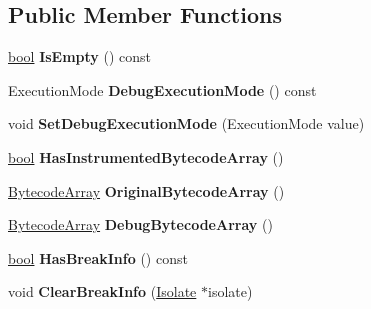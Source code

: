 \subsection*{Public Member Functions}
\begin{DoxyCompactItemize}
\item 
\mbox{\label{classv8_1_1internal_1_1DebugInfo_aa28d22bfcd83df5195dfd2e04b720a31}} 
\mbox{\hyperlink{classbool}{bool}} {\bfseries Is\+Empty} () const
\item 
\mbox{\label{classv8_1_1internal_1_1DebugInfo_ac57aa4fb4a047c9a174262c4e2c814ab}} 
Execution\+Mode {\bfseries Debug\+Execution\+Mode} () const
\item 
\mbox{\label{classv8_1_1internal_1_1DebugInfo_a32fd8f3c56dd7eab3fac29a5e15f8cf4}} 
void {\bfseries Set\+Debug\+Execution\+Mode} (Execution\+Mode value)
\item 
\mbox{\label{classv8_1_1internal_1_1DebugInfo_a00da3b3beed9a5a223e71aaecc738a51}} 
\mbox{\hyperlink{classbool}{bool}} {\bfseries Has\+Instrumented\+Bytecode\+Array} ()
\item 
\mbox{\label{classv8_1_1internal_1_1DebugInfo_a57db72d187d45e8a06ffc08b3fbd3fd8}} 
\mbox{\hyperlink{classv8_1_1internal_1_1BytecodeArray}{Bytecode\+Array}} {\bfseries Original\+Bytecode\+Array} ()
\item 
\mbox{\label{classv8_1_1internal_1_1DebugInfo_ad97ef9d35ce3df71c05a5f3d529b441f}} 
\mbox{\hyperlink{classv8_1_1internal_1_1BytecodeArray}{Bytecode\+Array}} {\bfseries Debug\+Bytecode\+Array} ()
\item 
\mbox{\label{classv8_1_1internal_1_1DebugInfo_a5ce1f31e3738705985a89c5957636798}} 
\mbox{\hyperlink{classbool}{bool}} {\bfseries Has\+Break\+Info} () const
\item 
\mbox{\label{classv8_1_1internal_1_1DebugInfo_a2a0bfe4d6e8e9ab37e5363a565e36774}} 
void {\bfseries Clear\+Break\+Info} (\mbox{\hyperlink{classv8_1_1internal_1_1Isolate}{Isolate}} $\ast$isolate)

\end{DoxyCompactItemize}
